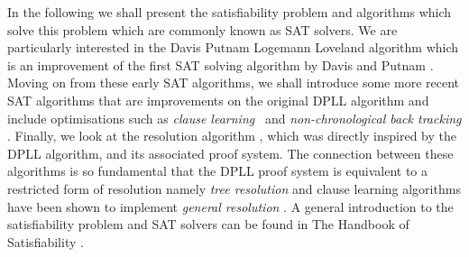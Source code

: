 \label{chapter:satbackground}
In the following we shall present the satisfiability problem and  algorithms which solve this problem which are commonly known as SAT solvers. We are particularly interested in the Davis Putnam Logemann Loveland algorithm \cite{DPLL} which is an improvement of the first SAT solving algorithm by Davis and Putnam \cite{MD60}. Moving on from these early SAT algorithms, we shall introduce some more recent SAT algorithms that are improvements on the original DPLL algorithm and include optimisations such as \emph{clause learning}~\cite{MS99} and \emph{non-chronological back tracking} \cite{MM01}. Finally, we look at the resolution algorithm \cite{JR65}, which was directly inspired by the DPLL algorithm, and its associated proof system. The connection between these algorithms is so fundamental  that the DPLL proof system is equivalent to a restricted form of resolution namely \emph{tree resolution} \cite{JR68} and clause learning algorithms have been shown to implement \emph{general resolution} \cite{KP09}. A general introduction to the satisfiability problem and SAT solvers can be found in The Handbook of Satisfiability \cite{AB09b}.


